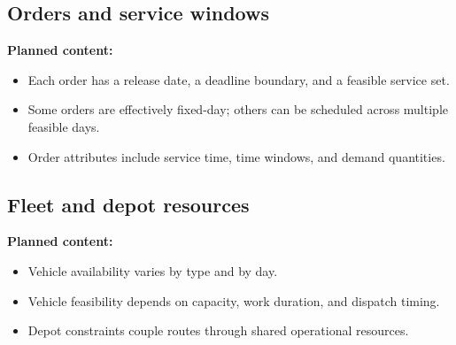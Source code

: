 %

\subsection{Orders and service windows}
\label{subsec:chapter03_orders_and_windows}

%

\noindent\textbf{Planned content:}
\begin{itemize}
    \item Each order has a release date, a deadline boundary, and a feasible service set.
    \item Some orders are effectively fixed-day; others can be scheduled across multiple feasible days.
    \item Order attributes include service time, time windows, and demand quantities.
\end{itemize}

\subsection{Fleet and depot resources}
\label{subsec:chapter03_fleet_and_depot_resources}

%

\noindent\textbf{Planned content:}
\begin{itemize}
    \item Vehicle availability varies by type and by day.
    \item Vehicle feasibility depends on capacity, work duration, and dispatch timing.
    \item Depot constraints couple routes through shared operational resources.
\end{itemize}

